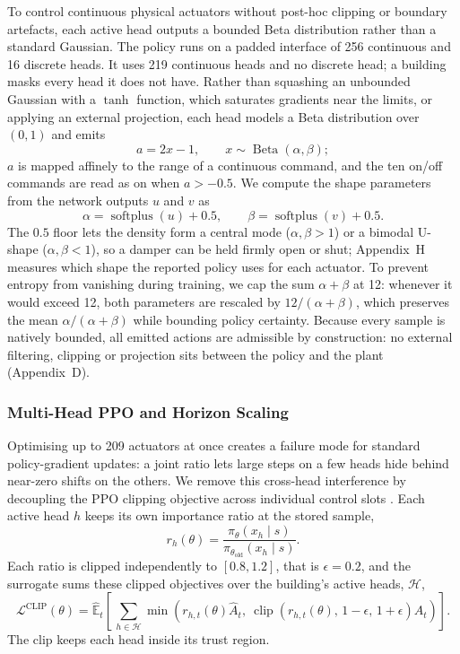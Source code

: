 \documentclass{article}
\begin{document}
To control continuous physical actuators without post-hoc clipping or boundary artefacts, each active head outputs a bounded Beta distribution rather than a standard Gaussian. The policy runs on a padded interface of 256 continuous and 16 discrete heads. It uses 219 continuous heads and no discrete head; a building masks every head it does not have. Rather than squashing an unbounded Gaussian with a $\tanh$ function, which saturates gradients near the limits, or applying an external projection, each head models a Beta distribution over $(0,1)$ \citep{chou2017beta} and emits
\[
a = 2x - 1, \qquad x \sim \operatorname{Beta}(\alpha, \beta);
\]
$a$ is mapped affinely to the range of a continuous command, and the ten on/off commands are read as on when $a > -0.5$.
We compute the shape parameters from the network outputs $u$ and $v$ as
\[
\alpha = \operatorname{softplus}(u) + 0.5, \qquad \beta = \operatorname{softplus}(v) + 0.5.
\]
The $0.5$ floor lets the density form a central mode ($\alpha,\beta>1$) or a bimodal U-shape ($\alpha,\beta<1$), so a damper can be held firmly open or shut; Appendix~H measures which shape the reported policy uses for each actuator. To prevent entropy from vanishing during training, we cap the sum $\alpha+\beta$ at 12: whenever it would exceed 12, both parameters are rescaled by $12/(\alpha+\beta)$, which preserves the mean $\alpha/(\alpha+\beta)$ while bounding policy certainty. Because every sample is natively bounded, all emitted actions are admissible by construction: no external filtering, clipping or projection sits between the policy and the plant (Appendix~D).

\subsubsection{Multi-Head PPO and Horizon Scaling}

Optimising up to 209 actuators at once creates a failure mode for standard policy-gradient updates: a joint ratio lets large steps on a few heads hide behind near-zero shifts on the others. We remove this cross-head interference by decoupling the PPO clipping objective across individual control slots \citep{han2019dimension}. Each active head $h$ keeps its own importance ratio at the stored sample,
\[
r_h(\theta) = \frac{\pi_\theta(x_h \mid s)}{\pi_{\theta_{\mathrm{old}}}(x_h \mid s)}.
\]
Each ratio is clipped independently to $[0.8, 1.2]$, that is $\epsilon = 0.2$, and the surrogate sums these clipped objectives over the building's active heads, $\mathcal{H}$,
\[
\mathcal{L}^{\mathrm{CLIP}}(\theta) = \hat{\mathbb{E}}_t\left[\,\sum_{h\in\mathcal{H}} \min\left(r_{h,t}(\theta)\hat{A}_t,\ \operatorname{clip}\left(r_{h,t}(\theta),\, 1-\epsilon,\, 1+\epsilon\right)\hat{A}_t\right)\right].
\]
The clip keeps each head inside its trust region.
\end{document}
